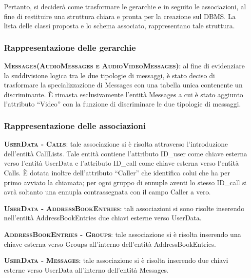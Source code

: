 Pertanto, si deciderà come trasformare le gerarchie e in seguito le associazioni, al fine di restituire una struttura chiara e pronta per la creazione sul DBMS\@. La lista delle classi proposta e lo schema associato, rappresentano tale struttura.

\subsubsection{Rappresentazione delle gerarchie}

\begin{description}
	\item{\scshape\bfseries Messages(AudioMessages e AudioVideoMessages)}: al fine di evidenziare la suddivisione logica tra le due tipologie di messaggi, è stato deciso di trasformare la specializzazione di Messages con una tabella unica contenente un discriminante. È rimasta esclusivamente l'entità Messages a cui è stato aggiunto l'attributo ``Video'' con la funzione di discriminare le due tipologie di messaggi.
\end{description}

\subsubsection{Rappresentazione delle associazioni}

\begin{description}
	\item{\scshape\bfseries UserData - Calls}: tale associazione si è risolta attraverso l'introduzione dell'entità CallLists. Tale entità contiene l'attributo ID\_user come chiave esterna verso l'entità UserData e l'attributo ID\_call come chiave esterna verso l'entità Calls. È dotata inoltre dell'attributo ``Caller'' che identifica colui che ha per primo avviato la chiamata; per ogni gruppo di ennuple aventi lo stesso ID\_call si avrà soltanto una ennupla contrassegnata con il campo Caller a vero.
	
	\item{\scshape\bfseries UserData - AddressBookEntries}: tali associazioni si sono risolte inserendo nell'entità AddressBookEntries due chiavi esterne verso UserData.
	
	\item{\scshape\bfseries AddressBookEntries - Groups}: tale associazione si è risolta inserendo una chiave esterna verso Groups all'interno dell'entità AddressBookEntries.
	
	\item{\scshape\bfseries UserData - Messages}: tale associazione si è risolta inserendo due chiavi esterne verso UserData all'interno dell'entità Messages. 
\end{description}

